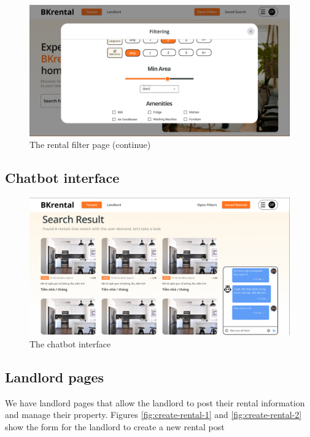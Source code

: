 \begin{figure}[ht]
    \centering
    \includegraphics[width=\textwidth]{Images/Mockup/rental_filter_3.png}
    \caption{The rental filter page (continue)}
    \label{fig:rental-filter-3} 
\end{figure}

\clearpage

\subsection{Chatbot interface}

\begin{figure}[ht]
    \centering
    \includegraphics[width=\textwidth]{Images/Mockup/chatbot.png}
    \caption{The chatbot interface}
    \label{fig:chatbot}
\end{figure}

\clearpage

\subsection{Landlord pages}
We have landlord pages that allow the landlord to post their rental information and manage their property. Figures \ref{fig:create-rental-1} and \ref{fig:create-rental-2} show the form for the landlord to create a new rental post

